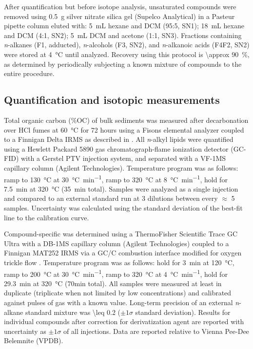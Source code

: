 After quantification but before isotope analysis, unsaturated compounds were removed using \SI{0.5}{g} silver nitrate silica gel (Supelco Analytical) in a Pasteur pipette column eluted with: \SI{5}{mL} hexane and DCM (95:5, SN1); \SI{18}{mL} hexane and DCM (4:1, SN2); \SI{5}{mL} DCM and acetone (1:1, SN3). Fractions containing \textit{n}-alkanes (F1, adducted), \textit{n}-alcohols (F3, SN2), and \textit{n}-alkanoic acids (F4F2, SN2) were stored at \SI{4}{\celsius} until analyzed. Recovery using this protocol is \SI{\approx 90}{\%}, as determined by periodically subjecting a known mixture of compounds to the entire procedure.

\subsection{Quantification and isotopic measurements}

Total organic carbon (\%OC) of bulk sediments was measured after decarbonation over HCl fumes at \SI{60}{\celsius} for 72 hours using a Fisons elemental analyzer coupled to a Finnigan Delta IRMS as described in \citet{Whiteside:2011jea}. All \textit{n}-alkyl lipids were quantified using a Hewlett Packard 5890 gas chromatograph-flame ionization detector (GC-FID) with a Gerstel PTV injection system, and separated with a VF-1MS capillary column (Agilent Technologies). Temperature program was as follows: ramp to \SI{130}{\celsius} at \SI{30}{\celsius.min^{-1}}, ramp to \SI{320}{\celsius} at \SI{8}{\celsius.min^{-1}}, hold for \SI{7.5}{min} at \SI{320}{\celsius} (\SI{35}{min} total). Samples were analyzed as a single injection and compared to an external standard run at 3 dilutions between every $\approx$ 5 samples. Uncertainty was calculated using the standard deviation of the best-fit line to the calibration curve.

Compound-specific  was determined using a ThermoFisher Scientific Trace GC Ultra with a DB-1MS capillary column (Agilent Technologies) coupled to a Finnigan MAT252 IRMS via a GC/C combustion interface modified for oxygen trickle flow \citep{Merritt:1995vt,Sessions:2006bn}. Temperature program was as follows: hold for \SI{3}{min} at \SI{120}{\celsius}, ramp to \SI{200}{\celsius} at \SI{30}{\celsius.min^{-1}}, ramp to \SI{320}{\celsius} at \SI{4}{\celsius.min^{-1}}, hold for \SI{29.3}{min} at \SI{320}{\celsius} (70min total). All samples were measured at least in duplicate (triplicate when not limited by low concentrations) and calibrated against pulses of  gas with a known  value. Long-term precision of an external \textit{n}-alkane standard mixture was \SI{\leq 0.2}{\permil} ($\pm 1\sigma$ standard deviation). Results for individual compounds after correction for derivatization agent are reported with uncertainty as $\pm 1\sigma$ of all injections. Data are reported relative to Vienna Pee-Dee Belemnite (VPDB).

